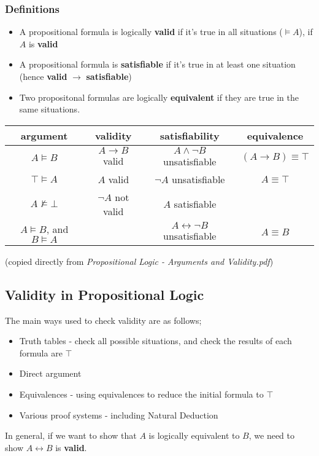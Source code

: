 \documentclass[a4paper, 12pt]{article}
\begin{document}
            \subsubsection*{Definitions}
                \begin{itemize}
                    \itemsep0em
                    \item A propositional formula is logically \textbf{valid} if it's true in all situations ($\vDash A$), if $A$ is \textbf{valid}
                    \item A propositional formula is \textbf{satisfiable} if it's true in at least one situation (hence \textbf{valid} $\rightarrow$ \textbf{satisfiable})
                    \item Two propositonal formulas are logically \textbf{equivalent} if they are true in the same situations.
                \end{itemize}
                \begin{center}
                    \begin{tabular}{|c|c|c|c|}
                        \hline
                        argument & validity & satisfiability & equivalence \\
                        \hline
                        $A \vDash B$ & $A \rightarrow B$ valid & $A \land \neg B$ unsatisfiable & $(A \rightarrow B) \equiv \top$ \\
                        $\top \vDash A$ & $A$ valid & $\neg A$ unsatisfiable & $A \equiv \top$ \\
                        $A \nvDash \bot$ & $\neg A$ not valid & $A$ satisfiable & \\
                        $A \vDash B$, and $B \vDash A$ & & $A \leftrightarrow \neg B$ unsatisfiable & $A \equiv B$ \\
                        \hline
                    \end{tabular}
                    \medskip

                    (copied directly from \textit{Propositional Logic - Arguments and Validity.pdf})
                \end{center}
        \subsection*{Validity in Propositional Logic}
            The main ways used to check validity are as follows;
            \begin{itemize}
                \itemsep0em
                \item Truth tables - check all possible situations, and check the results of each formula are $\top$
                \item Direct argument
                \item Equivalences - using equivalences to reduce the initial formula to $\top$
                \item Various proof systems - including Natural Deduction
            \end{itemize}
            In general, if we want to show that $A$ is logically equivalent to $B$, we need to show $A \leftrightarrow B$ is \textbf{valid}.
\end{document}
